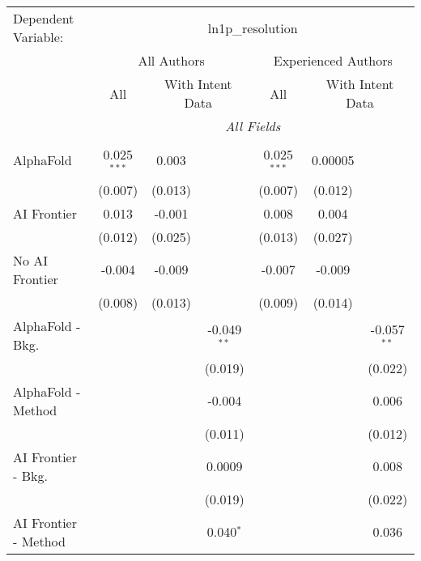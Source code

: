 \begingroup
\centering
\begin{tabular}{lcccccc}
   \tabularnewline \midrule \midrule
   Dependent Variable: & \multicolumn{6}{c}{ln1p\_resolution}\\
 & \multicolumn{3}{c}{All Authors} & \multicolumn{3}{c}{Experienced Authors} \\
\cmidrule(lr){2-4} \cmidrule(lr){5-7}
 & \multicolumn{1}{c}{All} & \multicolumn{2}{c}{With Intent Data} & \multicolumn{1}{c}{All} & \multicolumn{2}{c}{With Intent Data} \\
\cmidrule(lr){2-2} \cmidrule(lr){3-4} \cmidrule(lr){5-5} \cmidrule(lr){6-7}
 & \multicolumn{6}{c}{\textit{All Fields}} \\ \\
   AlphaFold               & 0.025$^{***}$ & 0.003   &               & 0.025$^{***}$ & 0.00005 &   \\   
                           & (0.007)       & (0.013) &               & (0.007)       & (0.012) &   \\   
   AI Frontier             & 0.013         & -0.001  &               & 0.008         & 0.004   &   \\   
                           & (0.012)       & (0.025) &               & (0.013)       & (0.027) &   \\   
   No AI Frontier          & -0.004        & -0.009  &               & -0.007        & -0.009  &   \\   
                           & (0.008)       & (0.013) &               & (0.009)       & (0.014) &   \\   
   AlphaFold - Bkg.        &               &         & -0.049$^{**}$ &               &         & -0.057$^{**}$\\   
                           &               &         & (0.019)       &               &         & (0.022)\\   
   AlphaFold - Method      &               &         & -0.004        &               &         & 0.006\\   
                           &               &         & (0.011)       &               &         & (0.012)\\   
   AI Frontier - Bkg.      &               &         & 0.0009        &               &         & 0.008\\   
                           &               &         & (0.019)       &               &         & (0.022)\\   
   AI Frontier - Method    &               &         & 0.040$^{*}$   &               &         & 0.036\\   

\end{tabular}
